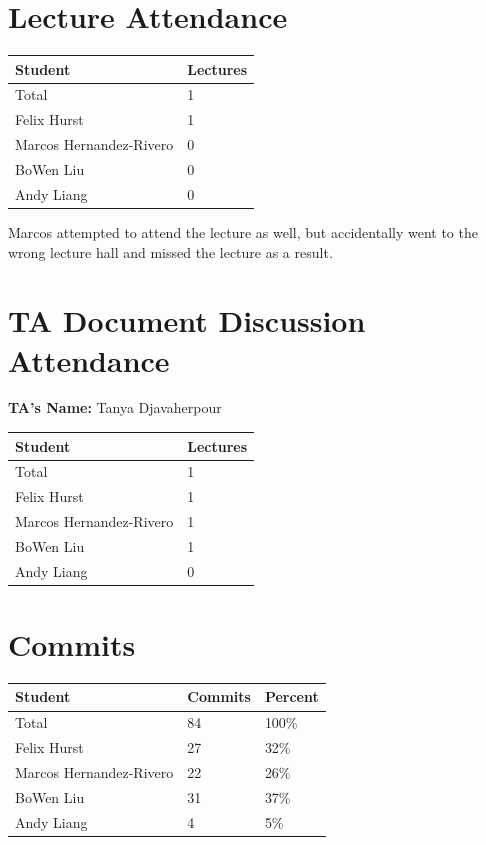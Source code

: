 \documentclass{article}
\begin{document}
\section{Lecture Attendance}

\begin{table}[H]
\centering
\begin{tabular}{ll}
\toprule
\textbf{Student} & \textbf{Lectures}\\
\midrule
Total & 1\\
Felix Hurst & 1\\
Marcos Hernandez-Rivero & 0\\
BoWen Liu & 0\\
Andy Liang & 0\\
\bottomrule
\end{tabular}
\end{table}

Marcos attempted to attend the lecture as well, but accidentally went to the wrong
lecture hall and missed the lecture as a result.

\section{TA Document Discussion Attendance}

\noindent \textbf{TA's Name: } Tanya Djavaherpour

\begin{table}[H]
\centering
\begin{tabular}{ll}
\toprule
\textbf{Student} & \textbf{Lectures}\\
\midrule
Total & 1\\
Felix Hurst & 1\\
Marcos Hernandez-Rivero & 1\\
BoWen Liu & 1\\
Andy Liang & 0\\
\bottomrule
\end{tabular}
\end{table}

\newpage

\section{Commits}

\begin{table}[H]
\centering
\begin{tabular}{lll}
\toprule
\textbf{Student} & \textbf{Commits} & \textbf{Percent}\\
\midrule
Total & 84 & 100\% \\
Felix Hurst & 27 & 32\% \\
Marcos Hernandez-Rivero & 22 & 26\% \\
BoWen Liu & 31 & 37\% \\
Andy Liang & 4 & 5\% \\
\bottomrule
\end{tabular}
\end{table}
\end{document}
